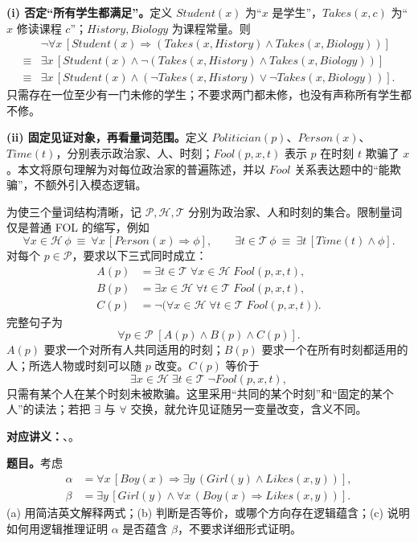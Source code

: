 \begin{checkedsolution}
\textbf{(i) 否定“所有学生都满足”。}定义 $Student(x)$ 为“$x$ 是学生”，$Takes(x,c)$ 为“$x$ 修读课程 $c$”；$History,Biology$ 为课程常量。则
\begin{align*}
&\neg\forall x\,[Student(x)\Rightarrow
       (Takes(x,History)\land Takes(x,Biology))]\\
\equiv{}&\exists x\,[Student(x)\land
       \neg(Takes(x,History)\land Takes(x,Biology))]\\
\equiv{}&\exists x\,[Student(x)\land
       (\neg Takes(x,History)\lor\neg Takes(x,Biology))].
\end{align*}
只需存在一位至少有一门未修的学生；不要求两门都未修，也没有声称所有学生都不修。

\textbf{(ii) 固定见证对象，再看量词范围。}定义 $Politician(p)$、$Person(x)$、$Time(t)$，分别表示政治家、人、时刻；$Fool(p,x,t)$ 表示 $p$ 在时刻 $t$ 欺骗了 $x$。本文将原句理解为对每位政治家的普遍陈述，并以 $Fool$ 关系表达题中的“能欺骗”，不额外引入模态逻辑。

为使三个量词结构清晰，记 $\mathcal P,\mathcal H,\mathcal T$ 分别为政治家、人和时刻的集合。限制量词仅是普通 FOL 的缩写，例如
\[
\forall x\in\mathcal H\,\phi\ \equiv\ \forall x\,[Person(x)\Rightarrow\phi],\qquad
\exists t\in\mathcal T\,\phi\ \equiv\ \exists t\,[Time(t)\land\phi].
\]
对每个 $p\in\mathcal P$，要求以下三式同时成立：
\begin{align*}
A(p)&=\exists t\in\mathcal T\;\forall x\in\mathcal H\;Fool(p,x,t),\\
B(p)&=\exists x\in\mathcal H\;\forall t\in\mathcal T\;Fool(p,x,t),\\
C(p)&=\neg\big(\forall x\in\mathcal H\;\forall t\in\mathcal T\;Fool(p,x,t)\big).
\end{align*}
完整句子为
\[
\boxed{\forall p\in\mathcal P\;[A(p)\land B(p)\land C(p)]}.
\]
$A(p)$ 要求一个对所有人共同适用的时刻；$B(p)$ 要求一个在所有时刻都适用的人；所选人物或时刻可以随 $p$ 改变。$C(p)$ 等价于
\[
\exists x\in\mathcal H\;\exists t\in\mathcal T\;\neg Fool(p,x,t),
\]
只需有某个人在某个时刻未被欺骗。这里采用“共同的某个时刻”和“固定的某个人”的读法；若把 $\exists$ 与 $\forall$ 交换，就允许见证随另一变量改变，含义不同。
\end{checkedsolution}

\textbf{对应讲义：}、。

\textbf{题目。}考虑
\begin{align*}
\alpha&=\forall x\,[Boy(x)\Rightarrow\exists y\,(Girl(y)\land Likes(x,y))],\\
\beta&=\exists y\,[Girl(y)\land\forall x\,(Boy(x)\Rightarrow Likes(x,y))].
\end{align*}
(a) 用简洁英文解释两式；(b) 判断是否等价，或哪个方向存在逻辑蕴含；(c) 说明如何用逻辑推理证明 $\alpha$ 是否蕴含 $\beta$，不要求详细形式证明。

